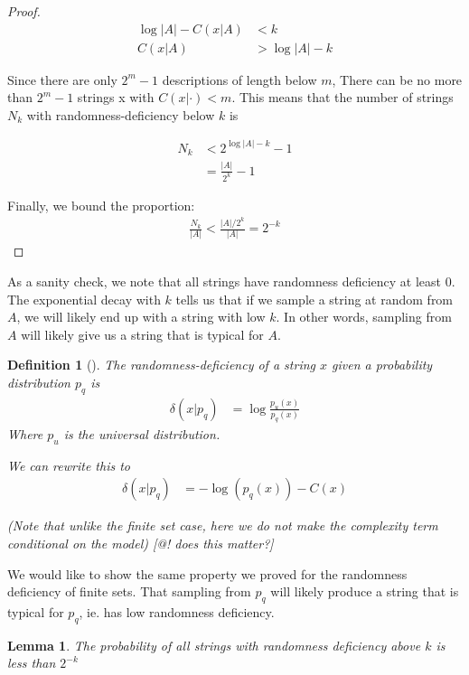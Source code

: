 \documentclass[10pt,a4paper,oneside]{article}
\newtheorem{lma}{Lemma}
\newtheorem{dfn}{Definition}
\begin{document}
\begin{proof}
\begin{align*}
\log |A| - C(x|A) &< k \\
C(x|A) &> \log |A| - k 
\end{align*}

Since there are only $2^m-1$ descriptions of length below $m$, There can be no more than $2^m-1$ strings x with $C(x|\cdot) < m$. This means that the number of strings $N_k$ with randomness-deficiency below $k$ is

\begin{align*}
N_k &< 2^{\log |A| - k}-1 \\
&= \frac{|A|}{2^k} - 1
\end{align*}

Finally, we bound the proportion:
\begin{align*}
\frac{N_k}{|A|} < \frac{|A|/2^k}{|A|} =  2^{-k}
\end{align*}
\end{proof}

As a sanity check, we note that all strings have randomness deficiency at least $0$. The exponential decay with $k$ tells us that if we sample a string at random from $A$, we will likely end up with a string with low $k$. In other words, sampling from $A$ will likely give us a string that is typical for $A$.

\begin{dfn}[{\cite{antunes2009depth}}]
The randomness-deficiency of a string $x$ given a probability distribution $p_q$ is 
\begin{align*}
\delta(x|p_q) &= \log \frac{p_u(x)}{p_q(x)}
\end{align*} 
Where $p_u$ is the universal distribution.

We can rewrite this to 
\begin{align*}
\delta(x|p_q) &= - \log(p_q(x)) - C(x) 
\end{align*}

(Note that unlike the finite set case, here we do not make the complexity term conditional on the model) [@! does this matter?]

\end{dfn}

We would like to show the same property we proved for the randomness deficiency of finite sets. That sampling from $p_q$ will likely produce a string that is typical for $p_q$, ie. has low randomness deficiency.

\begin{lma}
The probability of all strings with randomness deficiency above $k$ is less than $2^{-k}$
\label{lma:rd-distributions}
\end{lma}
\end{document}
